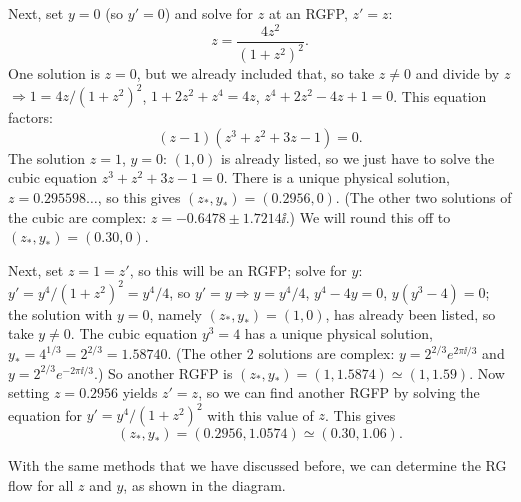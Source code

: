 Next, set $y = 0$ (so $y' = 0$) and solve for $z$ at an RGFP, $z' = z$:
\begin{equation}
  z = \frac{4z^2}{(1+z^2)^2}.
\end{equation}
One solution is $z = 0$, but we already included that, so take $z\ne 0$ and divide by $z$
$\Rightarrow 1 = 4z/(1+z^2)^2$, $1+2z^2+z^4 = 4z$, $z^4+2z^2-4z+1 = 0$. This equation factors:
\begin{equation}
  (z-1)(z^3+z^2+3z-1) = 0 .
\end{equation}
The solution $z = 1$, $y = 0$: $(1,0)$ is already listed, so we just have to solve the cubic equation
$z^3+z^2+3z-1 = 0$. There is a unique physical solution, $z = 0.295598\ldots$, so this gives
$(z_*,y_*) = (0.2956,0)$. (The other two solutions of the cubic are complex: $z = -0.6478\pm 1.7214\ii$.)
We will round this off to $(z_*,y_*) = (0.30,0)$.

Next, set $z = 1 = z'$, so this will be an RGFP; solve for $y$: $y' = y^4/(1+z^2)^2 = y^4/4$,
so $y' = y\Rightarrow y = y^4/4$, $y^4-4y = 0$, $y(y^3-4) = 0$; the solution with $y = 0$, namely
$(z_*,y_*) = (1,0)$, has already been listed, so take $y\ne 0$. The cubic equation $y^3 = 4$ has a unique
physical solution, $y_* = 4^{1/3} = 2^{2/3} = 1.58740$. (The other 2 solutions are complex:
$y = 2^{2/3}e^{2\pi\ii/3}$ and $y = 2^{2/3}e^{-2\pi\ii/3}$.) So another RGFP is
$(z_*,y_*) = (1,1.5874)\simeq(1,1.59)$. Now setting $z = 0.2956$ yields $z' = z$, so we can find another RGFP
by solving the equation for $y' = y^4/(1+z^2)^2$ with this value of $z$. This gives
\begin{equation}
  (z_*,y_*) = (0.2956,1.0574)\simeq(0.30,1.06).
\end{equation}

With the same methods that we have discussed before, we can determine the RG flow for all $z$ and $y$, as
shown in the diagram.

